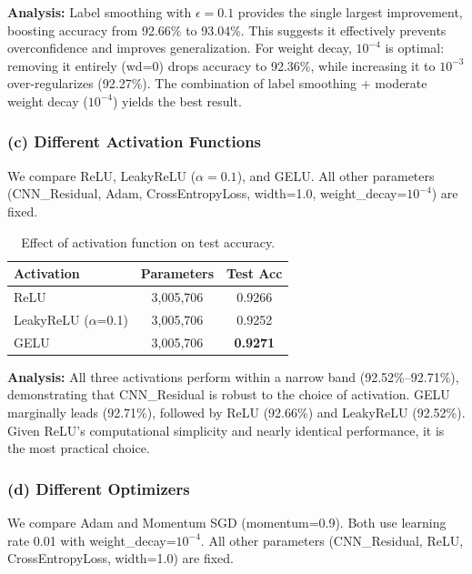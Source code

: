\documentclass[11pt,a4paper]{article}
\begin{document}
\textbf{Analysis:} Label smoothing with $\epsilon=0.1$ provides the single largest improvement, boosting accuracy from 92.66\% to 93.04\%. This suggests it effectively prevents overconfidence and improves generalization. For weight decay, $10^{-4}$ is optimal: removing it entirely (wd=0) drops accuracy to 92.36\%, while increasing it to $10^{-3}$ over-regularizes (92.27\%). The combination of label smoothing + moderate weight decay ($10^{-4}$) yields the best result.

\subsubsection{(c) Different Activation Functions}

We compare ReLU, LeakyReLU ($\alpha=0.1$), and GELU. All other parameters (CNN\_Residual, Adam, CrossEntropyLoss, width=1.0, weight\_decay=$10^{-4}$) are fixed.

\begin{table}[H]
\centering
\caption{Effect of activation function on test accuracy.}
\label{tab:activation}
\begin{tabular}{@{}lcc@{}}
\toprule
\textbf{Activation} & \textbf{Parameters} & \textbf{Test Acc} \\
\midrule
ReLU                    & 3,005,706 & 0.9266 \\
LeakyReLU ($\alpha$=0.1) & 3,005,706 & 0.9252 \\
GELU                    & 3,005,706 & \textbf{0.9271} \\
\bottomrule
\end{tabular}
\end{table}

\textbf{Analysis:} All three activations perform within a narrow band (92.52\%--92.71\%), demonstrating that CNN\_Residual is robust to the choice of activation. GELU marginally leads (92.71\%), followed by ReLU (92.66\%) and LeakyReLU (92.52\%). Given ReLU's computational simplicity and nearly identical performance, it is the most practical choice.

\subsubsection{(d) Different Optimizers}

We compare Adam and Momentum SGD (momentum=0.9). Both use learning rate 0.01 with weight\_decay=$10^{-4}$. All other parameters (CNN\_Residual, ReLU, CrossEntropyLoss, width=1.0) are fixed.
\end{document}
